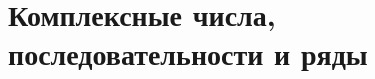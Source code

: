 \documentclass[../main.tex]{subfiles}
\begin{document}
 \chapter{Комплексные числа, последовательности и ряды}
 
 
\end{document}
